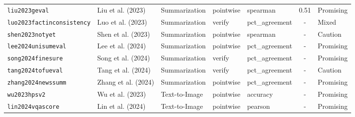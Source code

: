 \begin{longtable}{@{}l l l l l c l@{}}
\texttt{liu2023geval} & Liu et al. (2023) & Summarization & pointwise & spearman & 0.51 & Promising \\
\texttt{luo2023factinconsistency} & Luo et al. (2023) & Summarization & verify & pct\_agreement & - & Mixed \\
\texttt{shen2023notyet} & Shen et al. (2023) & Summarization & pointwise & spearman & - & Caution \\
\texttt{lee2024unisumeval} & Lee et al. (2024) & Summarization & pointwise & pct\_agreement & - & Promising \\
\texttt{song2024finesure} & Song et al. (2024) & Summarization & verify & pct\_agreement & - & Promising \\
\texttt{tang2024tofueval} & Tang et al. (2024) & Summarization & verify & pct\_agreement & - & Caution \\
\texttt{zhang2024newssumm} & Zhang et al. (2024) & Summarization & pointwise & pct\_agreement & - & Promising \\
\texttt{wu2023hpsv2} & Wu et al. (2023) & Text-to-Image & pointwise & accuracy & - & Promising \\
\texttt{lin2024vqascore} & Lin et al. (2024) & Text-to-Image & pointwise & pearson & - & Promising \\
\bottomrule
\end{longtable}